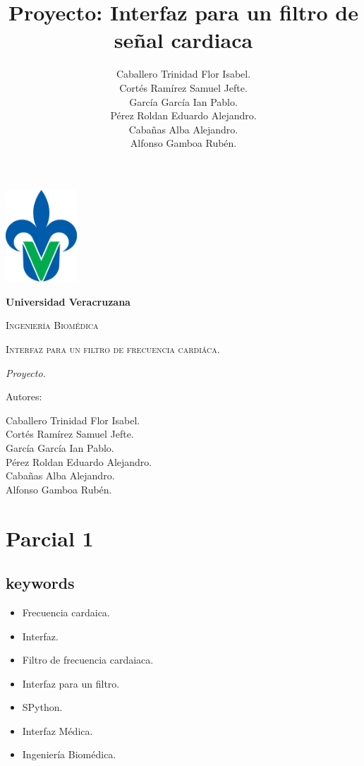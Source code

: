 \documentclass[14pt]{report}
\title{Proyecto: Interfaz para un filtro de señal cardiaca}
\author{Caballero Trinidad Flor Isabel. \\ Cortés Ramírez Samuel Jefte. \\ García García Ian Pablo. \\ Pérez Roldan Eduardo Alejandro. \\ Cabañas Alba Alejandro. \\ Alfonso Gamboa Rubén.}
\begin{document}
\begin{titlepage}
	\centering
	{\includegraphics[width=0.2\textwidth]{recursos/Universidad_Veracruzana}\par}
	\vspace{1cm}
	{\bfseries\LARGE Universidad Veracruzana \par}
	\vspace{1cm}
	{\scshape\Large Ingeniería Biomédica \par}
	\vspace{3cm}
	{\scshape\Huge Interfaz para un filtro de frecuencia cardiáca. \par}
	\vspace{2cm}
	{\itshape\Large Proyecto. \par}
	\vfill
	{\Large Autores: \par}
	{\Large Caballero Trinidad Flor Isabel. \\ Cortés Ramírez Samuel Jefte. \\ García García Ian Pablo. \\ Pérez Roldan Eduardo Alejandro. \\ Cabañas Alba Alejandro. \\ Alfonso Gamboa Rubén. \par}
	\vfill
	
\end{titlepage}

\chapter{Parcial 1}
	\section{keywords}
		\begin{itemize}
			\item Frecuencia cardaica.
			\item Interfaz.
			\item Filtro de frecuencia cardaiaca.
			\item Interfaz para un filtro.
			\item SPython.
			\item Interfaz Médica.
			\item Ingeniería Biomédica.
		\end{itemize}
	
\end{document}
